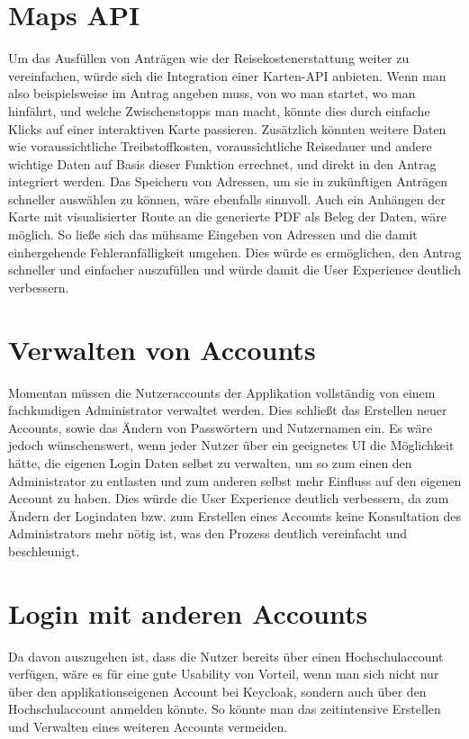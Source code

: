 \section{Maps \ac{API}}\label{sec: maps api}
Um das Ausfüllen von Anträgen wie der Reisekostenerstattung weiter zu vereinfachen, würde
sich die Integration einer Karten-\ac{API} anbieten. Wenn man also beispielsweise im
Antrag angeben muss, von wo man startet, wo man hinfährt, und welche Zwischenstopps man
macht, könnte dies durch einfache Klicks auf einer interaktiven Karte passieren. Zusätzlich
könnten weitere Daten wie voraussichtliche Treibstoffkosten, voraussichtliche Reisedauer
und andere wichtige Daten auf Basis dieser Funktion errechnet, und direkt in den Antrag
integriert werden. Das Speichern von Adressen, um sie in zukünftigen Anträgen schneller
auswählen zu können, wäre ebenfalls sinnvoll.
Auch ein Anhängen der Karte mit visualisierter Route an die generierte
\ac{PDF} als Beleg der Daten, wäre möglich. So ließe sich das mühsame Eingeben von Adressen
und die damit einhergehende Fehleranfälligkeit umgehen. Dies würde es 
ermöglichen, den Antrag schneller und einfacher auszufüllen und würde damit die User
Experience deutlich verbessern.

\section{Verwalten von Accounts}\label{sec: verwalten von Accounts}
Momentan müssen die Nutzeraccounts der Applikation vollständig von einem fachkundigen
Administrator verwaltet werden. Dies schließt das Erstellen neuer Accounts, sowie das
Ändern von Passwörtern und Nutzernamen ein. Es wäre jedoch wünschenswert, wenn jeder
Nutzer über ein geeignetes \ac{UI} die Möglichkeit hätte, die eigenen Login Daten selbst
zu verwalten, um so zum einen den Administrator zu entlasten und zum anderen selbst mehr
Einfluss auf den eigenen Account zu haben. Dies würde die User Experience deutlich
verbessern, da zum Ändern der Logindaten bzw. zum Erstellen eines Accounts keine
Konsultation des Administrators mehr nötig ist, was den Prozess deutlich vereinfacht und
beschleunigt.

\section{Login mit anderen Accounts}\label{sec: login mit anderen Accounts}
Da davon auszugehen ist, dass die Nutzer bereits über einen Hochschulaccount verfügen,
wäre es für eine gute Usability von Vorteil, wenn man sich nicht nur über den
applikationseigenen Account bei Keycloak, sondern auch über den Hochschulaccount
anmelden könnte. So könnte man das zeitintensive Erstellen und Verwalten eines
weiteren Accounts vermeiden.

